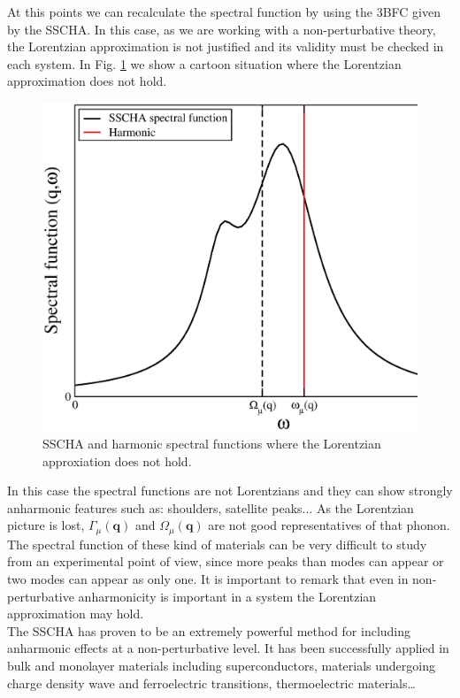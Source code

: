 At this points we can recalculate the spectral function by using the 3BFC given by the SSCHA. In this case, as we are working with a non-perturbative theory, the Lorentzian approximation is not justified and its validity must be checked in each system. In Fig. \ref{instoy2} we show a cartoon situation where the Lorentzian approximation does not hold.
\begin{figure}[h]
\begin{center}
\includegraphics[width=0.9\linewidth]{Figures/ins-toy2.eps}
\caption[SSCHA and harmonic spectral functions]{SSCHA and harmonic spectral functions where the Lorentzian approxiation does not hold.}
\label{instoy2}
\end{center}
\end{figure}
In this case the spectral functions are not Lorentzians and they can show strongly anharmonic features such as: shoulders, satellite peaks$\dots$ As the Lorentzian picture is lost, $\Gamma_{\mu}(\mathbf{q})$ and $\Omega_{\mu}(\mathbf{q})$ are not good representatives of that phonon. The spectral function of these kind of materials can be very difficult to study from an experimental point of view, since more peaks than modes can appear or two modes can appear as only one. It is important to remark that even in non-perturbative anharmonicity is important in a system the Lorentzian approximation may hold. \\

The SSCHA has proven to be an extremely powerful method for including anharmonic effects at a non-perturbative level. It has been successfully applied in bulk and monolayer materials including 
superconductors\cite{errea2013first,errea2016quantum}, materials undergoing charge density wave\cite{leroux2015strong,bianco2019quantum} and ferroelectric\cite{ribeiro2018strong} transitions, thermoelectric 
materials\cite{aseginolaza2019phonon}\dots
